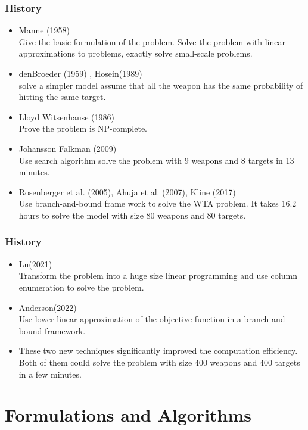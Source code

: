 \documentclass[CJK,10pt]{beamer}
\begin{document}
\begin{frame}
    \frametitle{History}
    \begin{itemize}
        \item Manne (1958)\\
         Give the basic formulation of the problem. Solve the problem with linear approximations to problems, exactly solve small-scale problems.
         \item denBroeder (1959) , Hosein(1989) \\
         solve a simpler model assume that all the weapon has the same probability of hitting the same target.
         \item Lloyd Witsenhause (1986) \\ Prove the problem is NP-complete.
         \item Johansson Falkman (2009) \\ Use search algorithm solve the problem with 9 weapons and 8 targets in 13 minutes.
         \item Rosenberger et al. (2005), Ahuja et al. (2007), Kline (2017)
         \\Use branch-and-bound frame work to solve the WTA problem. It takes 16.2 hours to solve the model with size 80 weapons and 80 targets. 
    \end{itemize}
\end{frame}



\begin{frame}
    \frametitle{History}
    \begin{itemize}
        \item Lu(2021)\\ Transform the problem into a huge size linear programming and use column enumeration to solve the problem.
        \item Anderson(2022)\\ Use lower linear approximation of the objective function in a branch-and-bound framework.
        \item These two new techniques significantly improved the computation efficiency. Both of them could solve the problem with size 400 weapons and 400 targets in a few minutes.
    \end{itemize}
\end{frame}



\section{Formulations and Algorithms}
\end{document}
